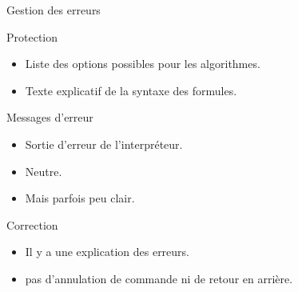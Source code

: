 \begin{frame}{Gestion des erreurs}
  \begin{block}{Protection}
    \begin{itemize}
    \item Liste des options possibles pour les algorithmes.
    \item Texte explicatif de la syntaxe des formules.
    \end{itemize}
  \end{block}
  
  \begin{block}{Messages d'erreur}
    \begin{itemize}
    \item Sortie d'erreur de l'interpréteur.
    \item Neutre.
    \item Mais parfois peu clair.
    \end{itemize}
  \end{block}
  
  \begin{block}{Correction}
    \begin{itemize}
    \item Il y a une explication des erreurs.
    \item pas d'annulation de commande ni de retour en arrière.
    \end{itemize}
  \end{block}
\end{frame}
